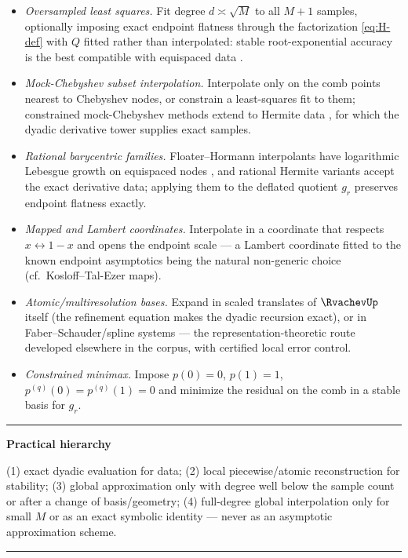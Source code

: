 \documentclass[11pt,oneside]{article}
\numberwithin{equation}{section}
\theoremstyle{definition}
\theoremstyle{remark}
\newenvironment{statusbox}[1]{%
  \par\smallskip\noindent\begin{center}\begin{minipage}{0.94\textwidth}%
  \hrule\vspace{0.5em}\noindent\textbf{#1}\par\smallskip
}{%
  \vspace{0.5em}\hrule\end{minipage}\end{center}\smallskip
}
\begin{document}
\begin{itemize}
\item\emph{Oversampled least squares.}  Fit degree $d\asymp\sqrt M$
to all $M+1$ samples, optionally imposing exact endpoint flatness
through the factorization \eqref{eq:H-def} with $Q$ fitted rather
than interpolated: stable root-exponential accuracy is the best
compatible with equispaced data
\cite{PlatteTrefethenKuijlaars2011,AdcockShadrin2023}.
\item\emph{Mock-Chebyshev subset interpolation.}  Interpolate only on
the comb points nearest to Chebyshev nodes, or constrain a
least-squares fit to them; constrained mock-Chebyshev methods extend
to Hermite data \cite{DellAccio2025}, for which the dyadic derivative
tower supplies exact samples.
\item\emph{Rational barycentric families.}  Floater--Hormann
interpolants have logarithmic Lebesgue growth on equispaced nodes
\cite{FloaterHormann2007,CirilloHormann2019}, and rational Hermite
variants accept the exact derivative data; applying them to the
deflated quotient $g_r$ preserves endpoint flatness exactly.
\item\emph{Mapped and Lambert coordinates.}  Interpolate in a
coordinate that respects $x\leftrightarrow1-x$ and opens the
endpoint scale --- a Lambert coordinate fitted to the known endpoint
asymptotics being the natural non-generic choice
(cf.\ Kosloff--Tal-Ezer maps).
\item\emph{Atomic/multiresolution bases.}  Expand in scaled
translates of $\RvachevUp$ itself (the refinement equation makes the dyadic
recursion exact), or in Faber--Schauder/spline systems --- the
representation-theoretic route developed elsewhere in the corpus,
with certified local error control.
\item\emph{Constrained minimax.}  Impose
$p(0)=0$, $p(1)=1$, $p^{(q)}(0)=p^{(q)}(1)=0$ and minimize the
residual on the comb in a stable basis for $g_r$.
\end{itemize}

\begin{statusbox}{Practical hierarchy}
(1) exact dyadic evaluation for data;
(2) local piecewise/atomic reconstruction for stability;
(3) global approximation only with degree well below the sample count
or after a change of basis/geometry;
(4) full-degree global interpolation only for small $M$ or as an
exact symbolic identity --- never as an asymptotic approximation
scheme.
\end{statusbox}
\end{document}

